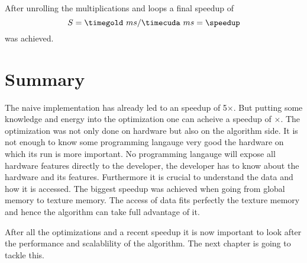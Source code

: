 After unrolling the multiplications and loops a final speedup of 
\fpDiv{\speedup}{\timegold}{\timecuda}
\begin{equation*}\label{eq:speedup11}
	S = \timegold\ ms/\timecuda\ ms = \speedup
\end{equation*}
was achieved.

\section{Summary} %
\label{sec:optimization_summary}
The naive implementation has already led to an speedup of 5$\times$. But putting
some knowledge and energy into the optimization one can acheive a speedup of 
\speedup$\times$. The optimization was not only done on hardware but also on the 
algorithm side. It is not enough to know some programming langauge very good the
hardware on which its run is more important. No programming langauge will expose
all hardware features directly to the developer, the developer has to know
about the hardware and its features. Furthermore it is crucial to understand
the data and how it is accessed. The biggest speedup was achieved when
going from global memory to texture memory. The access of data fits perfectly
the texture memory and hence the algorithm can take full advantage of it. 

After all the optimizations and a recent speedup it is now important to look 
after the performance and scalablility of the algorithm. The next chapter is 
going to tackle this. 




